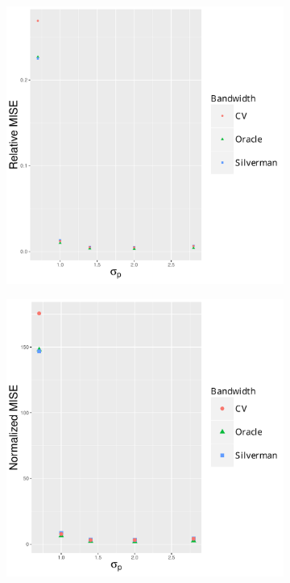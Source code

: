 \begin{figure}[htbp]
\begin{subfigure}[t]{0.24\textwidth}
        \includegraphics[width=\textwidth]{results/by_population_spread/RMISE-vs-population-spread}
        \caption{}
        \label{fig:ise:pSD_100_1h:rmise}
    \end{subfigure}
    \begin{subfigure}[t]{0.24\textwidth}
        \includegraphics[width=\textwidth]{results/by_population_spread/NMISE-vs-population-spread}

\end{subfigure}
\end{figure}
